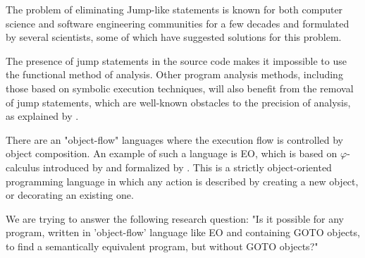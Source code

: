 The problem of eliminating Jump-like statements is known for both computer science and software engineering communities for a few decades and formulated by several scientists, some of which have suggested solutions for this problem.

The presence of jump statements in the source code makes it impossible to use the functional method of analysis.
Other program analysis methods, including those based on symbolic execution techniques, will also benefit from the removal of jump statements, which are well-known obstacles to the precision of analysis, as explained by \citet{baldoni2018survey}.

There are an "object-flow" languages where the execution flow is controlled by object composition.
An example of such a language is EO, which is based on $\varphi$-calculus introduced by \citet{bugayenko2021eolang} and formalized by \citet{kudasov2021}.
This is a strictly object-oriented programming language in which any action is described by creating a new object, or decorating an existing one.

We are trying to answer the following research question: "Is it possible for any program, written in 'object-flow' language like EO and containing GOTO objects, to find a semantically equivalent program, but without GOTO objects?"
